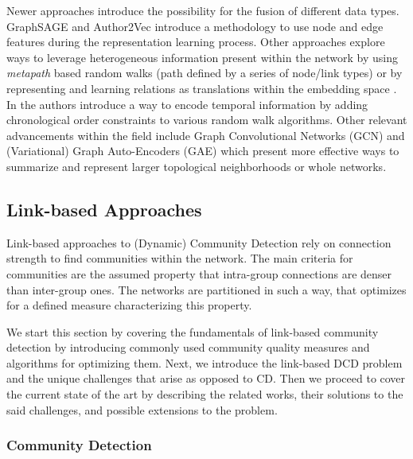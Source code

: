 \documentclass[
acmsmall,
nonacm,
screen,
acmthm]{../../scripts/pandoc/templates/acmart}
\begin{document}
Newer approaches introduce the possibility for the fusion of different
data types. GraphSAGE
\citep{hamiltonInductiveRepresentationLearning2018} and Author2Vec
\citep{wuAuthor2VecFrameworkGenerating2020} introduce a methodology to
use node and edge features during the representation learning process.
Other approaches explore ways to leverage heterogeneous information
present within the network by using \emph{metapath} based random walks
(path defined by a series of node/link types)
\citep{dongMetapath2vecScalableRepresentation2017} or by representing
and learning relations as translations within the embedding space
\citep{bordesTranslatingEmbeddingsModeling2013}. In
\citet{nguyenContinuousTimeDynamicNetwork2018} the authors introduce a
way to encode temporal information by adding chronological order
constraints to various random walk algorithms. Other relevant
advancements within the field include Graph Convolutional Networks (GCN)
\citep{kipfSemiSupervisedClassificationGraph2017a} and (Variational)
Graph Auto-Encoders (GAE) \citep{kipfVariationalGraphAutoEncoders2016}
which present more effective ways to summarize and represent larger
topological neighborhoods or whole networks.

\hypertarget{link-based-approaches}{%
\subsection{Link-based Approaches}\label{link-based-approaches}}

Link-based approaches to (Dynamic) Community Detection rely on
connection strength to find communities within the network. The main
criteria for communities are the assumed property that intra-group
connections are denser than inter-group ones. The networks are
partitioned in such a way, that optimizes for a defined measure
characterizing this property.

We start this section by covering the fundamentals of link-based
community detection by introducing commonly used community quality
measures and algorithms for optimizing them. Next, we introduce the
link-based DCD problem and the unique challenges that arise as opposed
to CD. Then we proceed to cover the current state of the art by
describing the related works, their solutions to the said challenges,
and possible extensions to the problem.

\hypertarget{community-detection-1}{%
\subsubsection{Community Detection}\label{community-detection-1}}
\end{document}
